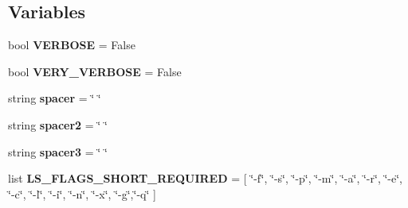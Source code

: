 \subsection*{Variables}
\begin{DoxyCompactItemize}
\item 
bool {\bfseries V\+E\+R\+B\+O\+SE} = False\hypertarget{namespacenegui_1_1pgdriveneestimator_aeae180a6a906ac89f58c9af1f6c8fd77}{}\label{namespacenegui_1_1pgdriveneestimator_aeae180a6a906ac89f58c9af1f6c8fd77}

\item 
bool {\bfseries V\+E\+R\+Y\+\_\+\+V\+E\+R\+B\+O\+SE} = False\hypertarget{namespacenegui_1_1pgdriveneestimator_ab3e4d5f9e16fe1e71748c637b908eb55}{}\label{namespacenegui_1_1pgdriveneestimator_ab3e4d5f9e16fe1e71748c637b908eb55}

\item 
string {\bfseries spacer} = \char`\"{} \char`\"{}\hypertarget{namespacenegui_1_1pgdriveneestimator_aafee69ac080e88e81d87a33561b3fcea}{}\label{namespacenegui_1_1pgdriveneestimator_aafee69ac080e88e81d87a33561b3fcea}

\item 
string {\bfseries spacer2} = \char`\"{} \char`\"{}\hypertarget{namespacenegui_1_1pgdriveneestimator_a9f80a81346d030624035928340fd4b9e}{}\label{namespacenegui_1_1pgdriveneestimator_a9f80a81346d030624035928340fd4b9e}

\item 
string {\bfseries spacer3} = \char`\"{} \char`\"{}\hypertarget{namespacenegui_1_1pgdriveneestimator_a28b0742536e40623d9882bf0631f6217}{}\label{namespacenegui_1_1pgdriveneestimator_a28b0742536e40623d9882bf0631f6217}

\item 
list {\bfseries L\+S\+\_\+\+F\+L\+A\+G\+S\+\_\+\+S\+H\+O\+R\+T\+\_\+\+R\+E\+Q\+U\+I\+R\+ED} = \mbox{[} \char`\"{}-\/f\char`\"{}, \char`\"{}-\/s\char`\"{}, \char`\"{}-\/p\char`\"{}, \char`\"{}-\/m\char`\"{}, \char`\"{}-\/a\char`\"{}, \char`\"{}-\/r\char`\"{}, \char`\"{}-\/e\char`\"{}, \char`\"{}-\/c\char`\"{}, \char`\"{}-\/l\char`\"{}, \char`\"{}-\/i\char`\"{}, \char`\"{}-\/n\char`\"{}, \char`\"{}-\/x\char`\"{}, \char`\"{}-\/g\char`\"{},\char`\"{}-\/q\char`\"{} \mbox{]}\hypertarget{namespacenegui_1_1pgdriveneestimator_a483e5730350478fd7a79e4a59c1381ef}{}\label{namespacenegui_1_1pgdriveneestimator_a483e5730350478fd7a79e4a59c1381ef}


\end{DoxyCompactItemize}

